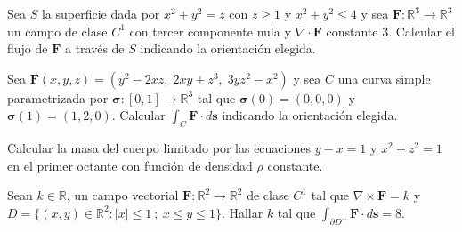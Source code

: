 
\begin{question}
    Sea  $S$  la superficie dada por $x^{2}+ y^{2} = z$ con $z \geq 1$  y $x^{2}+ y^{2} \leq 4$  y sea  $\mathbf{F}:\mathbb{R}^{3}\rightarrow\mathbb{R}^{3}$  un campo de clase $C^{1}$ con tercer componente  nula y $\nabla \cdot \mathbf{F}$ constante 3. Calcular el flujo de  $\mathbf{F}$  a trav\'es de $S$ indicando la orientaci\'on elegida.
\end{question}


\begin{question}
    Sea $\mathbf{F}(x,y,z) = (y^{2}-2xz,\;2xy+z^{3},\;3yz^{2}-x^{2}) $ y sea  $C$ una curva simple parametrizada por $\boldsymbol{\sigma}:[0,1]\rightarrow \mathbb{R}^{3}$
tal que $\boldsymbol{\sigma}(0)=(0,0,0)$ y $\boldsymbol{\sigma}(1)=(1,2,0)$. Calcular $\int_{C} \mathbf{F}\cdot d\mathbf{s}$ indicando la orientaci\'on elegida. 
\end{question}


\begin{question}
    Calcular la masa del cuerpo limitado por las ecuaciones $y-x=1$ y $x^{2}+ z^{2} = 1$ en el primer octante con funci\'on de densidad $\rho$ constante.  
\end{question}


\begin{question}
     Sean  $k\in\mathbb{R}$,  un campo vectorial $\mathbf{F}:\mathbb{R}^{2}\rightarrow\mathbb{R}^{2}$   de clase $C^{1}$ tal que $\nabla\times \mathbf{F}=k$ y $D=\{ (x,y) \in \mathbb{R}^{2} :  |x| \leq 1 \:  ; \:   x \leq y\leq 1  \}.$ Hallar $k$ tal que $\int_{\partial D^{+}}\mathbf{F}\cdot d\mathbf{s} = 8$. 
\end{question}

